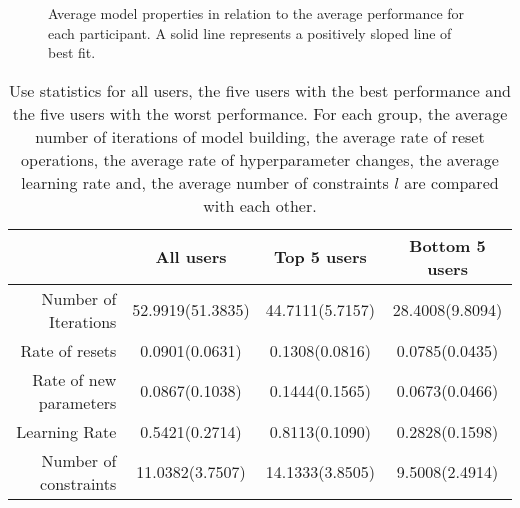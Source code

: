 \begin{figure}[!ht]
    \centering
    \resizebox{\linewidth}{!}{}
    \caption{Average model properties in relation to the average %
performance for each participant. A solid line represents a positively sloped line of best fit.}
    \label{fig:user_behave}
\end{figure}


\begin{table}[!ht]
    \centering
    \caption{Use statistics for all users, the five users with the best performance and the five users with the worst performance. For each group, the average number of iterations of model building, the average rate of reset operations, the average rate of hyperparameter changes, the average learning rate and, the average number of constraints $l$ are compared with each other.}
    \begin{tabular}{r|c|c|c}

        & All users & Top 5 users & Bottom 5 users \\ 
        \hline\hline
        Number of Iterations & 52.9919(51.3835) & 44.7111(5.7157) & 28.4008(9.8094) \\ \hline
        Rate of resets & 0.0901(0.0631) & 0.1308(0.0816) & 0.0785(0.0435) \\ \hline
        Rate of new parameters & 0.0867(0.1038) & 0.1444(0.1565) & 0.0673(0.0466) \\ \hline
        Learning Rate & 0.5421(0.2714) & 0.8113(0.1090) & 0.2828(0.1598) \\ \hline
        Number of constraints & 11.0382(3.7507) & 14.1333(3.8505) & 9.5008(2.4914)
    \end{tabular}
    \label{tab:user_stats}
\end{table}
